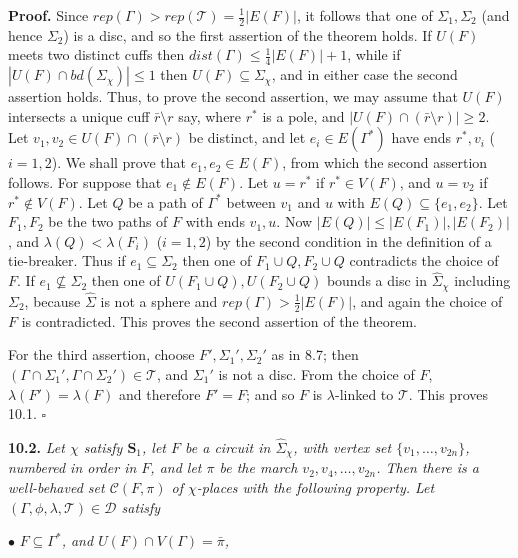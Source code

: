\textbf{Proof.} Since $rep(\Gamma) > rep(\mathscr{T}) = \frac{1}{2}|E(F)|$, it follows that one of $\Sigma_1, \Sigma_2$ (and hence $\Sigma_2$) is a disc, and so the first assertion of the theorem holds. If $U(F)$ meets two distinct cuffs then $dist(\Gamma) \le \frac{1}{4}|E(F)| + 1$, while if $|U(F) \cap bd(\Sigma_\chi)| \le 1$ then $U(F) \subseteq \Sigma_\chi$, and in either case the second assertion holds. Thus, to prove the second assertion, we may assume that $U(F)$ intersects a unique cuff $\bar{r}\setminus r$ say, where $r^*$ is a pole, and $|U(F) \cap (\bar{r}\setminus r)| \ge 2$. Let $v_1, v_2 \in U(F) \cap (\bar{r}\setminus r)$ be distinct, and let $e_i \in E(\Gamma^*)$ have ends $r^*, v_i$ ($i = 1, 2$). We shall prove that $e_1, e_2 \in E(F)$, from which the second assertion follows. For suppose that $e_1 \notin E(F)$. Let $u = r^*$ if $r^* \in V(F)$, and $u = v_2$ if $r^* \notin V(F)$. Let $Q$ be a path of $\Gamma^*$ between $v_1$ and $u$ with $E(Q) \subseteq \{e_1, e_2\}$. Let $F_1, F_2$ be the two paths of $F$ with ends $v_1, u$. Now $|E(Q)| \le |E(F_1)|, |E(F_2)|$, and $\lambda(Q) < \lambda(F_i)$ ($i = 1, 2$) by the second condition in the definition of a tie-breaker. Thus if $e_1 \subseteq \Sigma_2$ then one of $F_1 \cup Q, F_2 \cup Q$ contradicts the choice of $F$. If $e_1 \not\subseteq \Sigma_2$ then one of $U(F_1 \cup Q), U(F_2 \cup Q)$ bounds a disc in $\hat{\Sigma}_\chi$ including $\Sigma_2$, because $\hat{\Sigma}$ is not a sphere and $rep(\Gamma) > \frac{1}{2}|E(F)|$, and again the choice of $F$ is contradicted. This proves the second assertion of the theorem.

For the third assertion, choose $F', \Sigma_1', \Sigma_2'$ as in 8.7; then $(\Gamma \cap \Sigma_1', \Gamma \cap \Sigma_2') \in \mathscr{T}$, and $\Sigma_1'$ is not a disc. From the choice of $F$, $\lambda(F') = \lambda(F)$ and therefore $F' = F$; and so $F$ is $\lambda$-linked to $\mathscr{T}$. This proves 10.1. $\square$

\textbf{10.2.} \textit{Let $\chi$ satisfy $\mathbf{S}_1$, let $F$ be a circuit in $\hat{\Sigma}_\chi$, with vertex set $\{v_1, \dots, v_{2n}\}$, numbered in order in $F$, and let $\pi$ be the march $v_2, v_4, \dots, v_{2n}$. Then there is a well-behaved set $\mathscr{C}(F, \pi)$ of $\chi$-places with the following property. Let $(\Gamma, \phi, \lambda, \mathscr{T}) \in \mathscr{D}$ satisfy}

\hspace*{12pt}$\bullet$ \textit{$F \subseteq \Gamma^*$, and $U(F) \cap V(\Gamma) = \bar{\pi}$,}

